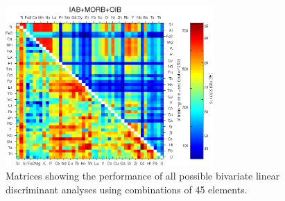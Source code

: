 \begin{figure}[htbp]
  \includegraphics[width=300]{figures/xPlotTrace2_linear_err.jpg}
  \caption[Matrices   showing   the  performance   of   all  possible   bivariate
discriminant analyses using combinations of 45 elements]
{Matrices   showing   the  performance   of   all  possible   bivariate linear
discriminant analyses using combinations of 45 elements.}
  \label{fig:trace2lin}
\end{figure}

